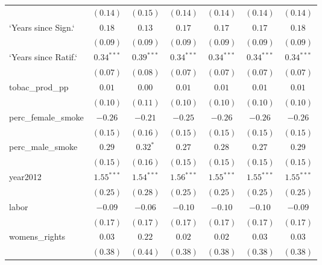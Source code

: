 \begin{table}[!h]
\begin{center}
\begin{tabular}{l c c c c c c }
                        & $(0.14)$     & $(0.15)$     & $(0.14)$     & $(0.14)$     & $(0.14)$     & $(0.14)$     \\
`Years since Sign.`     & $0.18$       & $0.13$       & $0.17$       & $0.17$       & $0.17$       & $0.18$       \\
                        & $(0.09)$     & $(0.09)$     & $(0.09)$     & $(0.09)$     & $(0.09)$     & $(0.09)$     \\
`Years since Ratif.`    & $0.34^{***}$ & $0.39^{***}$ & $0.34^{***}$ & $0.34^{***}$ & $0.34^{***}$ & $0.34^{***}$ \\
                        & $(0.07)$     & $(0.08)$     & $(0.07)$     & $(0.07)$     & $(0.07)$     & $(0.07)$     \\
tobac\_prod\_pp         & $0.01$       & $0.00$       & $0.01$       & $0.01$       & $0.01$       & $0.01$       \\
                        & $(0.10)$     & $(0.11)$     & $(0.10)$     & $(0.10)$     & $(0.10)$     & $(0.10)$     \\
perc\_female\_smoke     & $-0.26$      & $-0.21$      & $-0.25$      & $-0.26$      & $-0.26$      & $-0.26$      \\
                        & $(0.15)$     & $(0.16)$     & $(0.15)$     & $(0.15)$     & $(0.15)$     & $(0.15)$     \\
perc\_male\_smoke       & $0.29$       & $0.32^{*}$   & $0.27$       & $0.28$       & $0.27$       & $0.29$       \\
                        & $(0.15)$     & $(0.16)$     & $(0.15)$     & $(0.15)$     & $(0.15)$     & $(0.15)$     \\
year2012                & $1.55^{***}$ & $1.54^{***}$ & $1.56^{***}$ & $1.55^{***}$ & $1.55^{***}$ & $1.55^{***}$ \\
                        & $(0.25)$     & $(0.28)$     & $(0.25)$     & $(0.25)$     & $(0.25)$     & $(0.25)$     \\
labor                   & $-0.09$      & $-0.06$      & $-0.10$      & $-0.10$      & $-0.10$      & $-0.09$      \\
                        & $(0.17)$     & $(0.17)$     & $(0.17)$     & $(0.17)$     & $(0.17)$     & $(0.17)$     \\
womens\_rights          & $0.03$       & $0.22$       & $0.02$       & $0.02$       & $0.03$       & $0.03$       \\
                        & $(0.38)$     & $(0.44)$     & $(0.38)$     & $(0.38)$     & $(0.38)$     & $(0.38)$     \\

\end{tabular}
\end{center}
\end{table}

